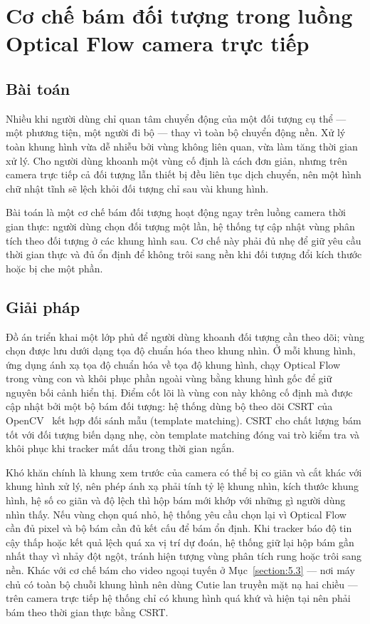 \documentclass[../DoAn.tex]{subfiles}
\begin{document}
\section{Cơ chế bám đối tượng trong luồng Optical Flow camera trực tiếp}
\label{section:5.4}
\subsection{Bài toán}
Nhiều khi người dùng chỉ quan tâm chuyển động của một đối tượng cụ thể --- một phương tiện, một người đi bộ --- thay vì toàn bộ chuyển động nền. Xử lý toàn khung hình vừa dễ nhiễu bởi vùng không liên quan, vừa làm tăng thời gian xử lý. Cho người dùng khoanh một vùng cố định là cách đơn giản, nhưng trên camera trực tiếp cả đối tượng lẫn thiết bị đều liên tục dịch chuyển, nên một hình chữ nhật tĩnh sẽ lệch khỏi đối tượng chỉ sau vài khung hình.

Bài toán là một cơ chế bám đối tượng hoạt động ngay trên luồng camera thời gian thực: người dùng chọn đối tượng một lần, hệ thống tự cập nhật vùng phân tích theo đối tượng ở các khung hình sau. Cơ chế này phải đủ nhẹ để giữ yêu cầu thời gian thực và đủ ổn định để không trôi sang nền khi đối tượng đổi kích thước hoặc bị che một phần.

\subsection{Giải pháp}
Đồ án triển khai một lớp phủ để người dùng khoanh đối tượng cần theo dõi; vùng chọn được lưu dưới dạng tọa độ chuẩn hóa theo khung nhìn. Ở mỗi khung hình, ứng dụng ánh xạ tọa độ chuẩn hóa về tọa độ khung hình, chạy Optical Flow trong vùng con và khôi phục phần ngoài vùng bằng khung hình gốc để giữ nguyên bối cảnh hiển thị. Điểm cốt lõi là vùng con này không cố định mà được cập nhật bởi một bộ bám đối tượng: hệ thống dùng bộ theo dõi CSRT của OpenCV~\cite{opencv-video-tracking} kết hợp đối sánh mẫu (template matching). CSRT cho chất lượng bám tốt với đối tượng biến dạng nhẹ, còn template matching đóng vai trò kiểm tra và khôi phục khi tracker mất dấu trong thời gian ngắn.

Khó khăn chính là khung xem trước của camera có thể bị co giãn và cắt khác với khung hình xử lý, nên phép ánh xạ phải tính tỷ lệ khung nhìn, kích thước khung hình, hệ số co giãn và độ lệch thì hộp bám mới khớp với những gì người dùng nhìn thấy. Nếu vùng chọn quá nhỏ, hệ thống yêu cầu chọn lại vì Optical Flow cần đủ pixel và bộ bám cần đủ kết cấu để bám ổn định. Khi tracker báo độ tin cậy thấp hoặc kết quả lệch quá xa vị trí dự đoán, hệ thống giữ lại hộp bám gần nhất thay vì nhảy đột ngột, tránh hiện tượng vùng phân tích rung hoặc trôi sang nền. Khác với cơ chế bám cho video ngoại tuyến ở Mục~\ref{section:5.3} --- nơi máy chủ có toàn bộ chuỗi khung hình nên dùng Cutie lan truyền mặt nạ hai chiều --- trên camera trực tiếp hệ thống chỉ có khung hình quá khứ và hiện tại nên phải bám theo thời gian thực bằng CSRT.
\end{document}
